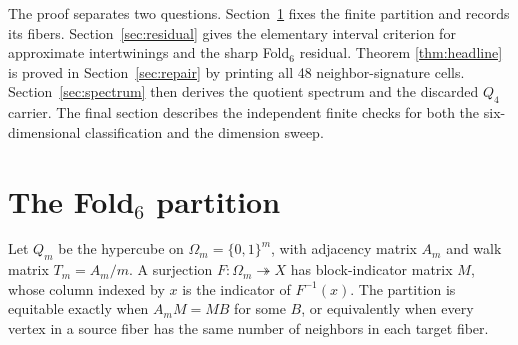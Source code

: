 \documentclass[12pt,a4paper]{article}
\theoremstyle{plain}
\theoremstyle{definition}
\numberwithin{equation}{section}
\begin{document}
The proof separates two questions.  Section~\ref{sec:fold6} fixes the finite partition
and records its fibers.  Section~\ref{sec:residual} gives the elementary interval
criterion for approximate intertwinings and the sharp Fold$_6$ residual.  Theorem
\ref{thm:headline} is proved in Section~\ref{sec:repair} by printing all 48
neighbor-signature cells.  Section~\ref{sec:spectrum} then derives the quotient
spectrum and the discarded \(Q_4\) carrier.  The final section describes the independent
finite checks for both the six-dimensional classification and the dimension sweep.

\section{The Fold$_6$ partition}\label{sec:fold6}
Let \(Q_m\) be the hypercube on \(\Omega_m=\{0,1\}^m\), with adjacency matrix
\(A_m\) and walk matrix \(T_m=A_m/m\).  A surjection \(F:\Omega_m\twoheadrightarrow X\)
has block-indicator matrix \(M\), whose column indexed by \(x\) is the indicator of
\(F^{-1}(x)\).  The partition is equitable exactly when \(A_mM=MB\) for some \(B\),
or equivalently when every vertex in a source fiber has the same number of neighbors
in each target fiber.
\end{document}
